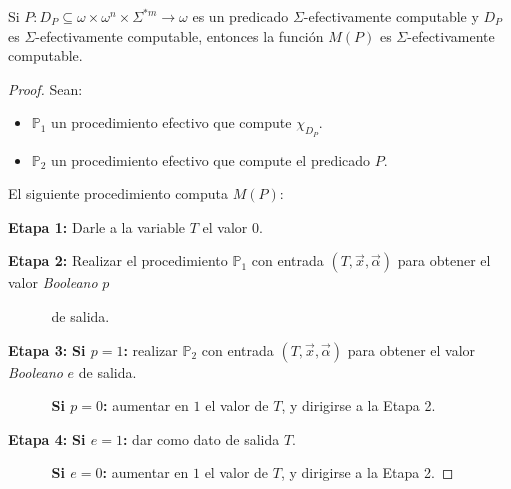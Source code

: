   \begin{lemma}
    \PN Si $P: D_{P} \subseteq \omega \times \omega^{n} \times \Sigma^{\ast m} \rightarrow \omega$ es un predicado
    $\Sigma$-efectivamente computable y $ D_{P}$ es $\Sigma$-efectivamente computable, entonces la función $M(P)$ es
    $\Sigma$-efectivamente computable.
  \end{lemma}
  \begin{proof}
    \PN Sean:

    \begin{itemize}
      \item $\mathbb{P}_{1}$ un procedimiento efectivo que compute $\chi_{D_{P}}$.
      \item $\mathbb{P}_{2}$ un procedimiento efectivo que compute el predicado $P$.
    \end{itemize}

    \PN El siguiente procedimiento computa $M(P)$:

    \vspace{3mm}
    \PN \textbf{Etapa 1:}
    Darle a la variable $T$ el valor $0$.

    \PN \textbf{Etapa 2:}
    Realizar el procedimiento $\mathbb{P}_{1}$ con entrada $(T,\vec{x},\vec{\alpha})$ para obtener el valor
    \textit{Booleano} $p$

    $\qquad\;\;\;\;$de salida.

    \PN \textbf{Etapa 3:}
    \textbf{Si $p=1$:} realizar $\mathbb{P}_{2}$ con entrada $(T,\vec{x},\vec{\alpha})$ para obtener el valor
    \textit{Booleano} $e$ de salida.

    $\qquad\;\;\;\;$\textbf{Si $p=0$:} aumentar en $1$ el valor de $T$, y dirigirse a la Etapa 2.

    \PN \textbf{Etapa 4:}
    \textbf{Si $e=1$:} dar como dato de salida $T$.

    $\qquad\;\;\;\;$\textbf{Si $e=0$:} aumentar en $1$ el valor de $T$, y dirigirse a la Etapa 2.
  \end{proof}

